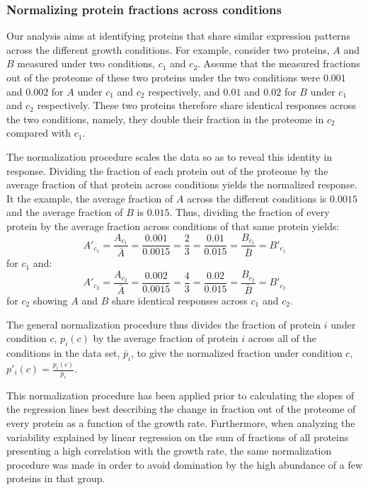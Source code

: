 \subsubsection{Normalizing protein fractions across conditions}
\label{concacrossconds} 
Our analysis aims at identifying proteins that share similar expression patterns across the different growth conditions.
For example, consider two proteins, $A$ and $B$ measured under two conditions, $c_1$ and $c_2$.
Assume that the measured fractions out of the proteome of these two proteins under the two conditions were $0.001$ and $0.002$ for $A$ under $c_1$ and $c_2$ respectively, and $0.01$ and $0.02$ for $B$ under $c_1$ and $c_2$ respectively.
These two proteins therefore share identical responses across the two conditions, namely, they double their fraction in the proteome in $c_2$ compared with $c_1$.

The normalization procedure scales the data so as to reveal this identity in response.
Dividing the fraction of each protein out of the proteome by the average fraction of that protein across conditions yields the normalized response.
It the example, the average fraction of $A$ across the different conditions is $0.0015$ and the average fraction of $B$ is $0.015$.
Thus, dividing the fraction of every protein by the average fraction across conditions of that same protein yields:
\[
A'_{c_1}=\frac{A_{c_1}}{\bar{A}}=\frac{0.001}{0.0015}=\frac{2}{3}=\frac{0.01}{0.015}=\frac{B_{c_1}}{\bar{B}}=B'_{c_1}
\]
for $c_1$ and:
\[
A'_{c_2}=\frac{A_{c_2}}{\bar{A}}=\frac{0.002}{0.0015}=\frac{4}{3}=\frac{0.02}{0.015}=\frac{B_{c_2}}{\bar{B}}=B'_{c_2}
\]
for $c_2$ showing $A$ and $B$ share identical responses across $c_1$ and $c_2$.

The general normalization procedure thus divides the fraction of protein $i$ under condition $c$, $p_i(c)$ by the average fraction of protein $i$ across all of the conditions in the data set, $\bar{p}_i$, to give the normalized fraction under condition $c$, $p'_i(c)=\frac{p_i(c)}{\bar{p}_i}$.

This normalization procedure has been applied prior to calculating the slopes of the regression lines best describing the change in fraction out of the proteome of every protein as a function of the growth rate.
Furthermore, when analyzing the variability explained by linear regression on the sum of fractions of all proteins presenting a high correlation with the growth rate, the same normalization procedure was made in order to avoid domination by the high abundance of a few proteins in that group.